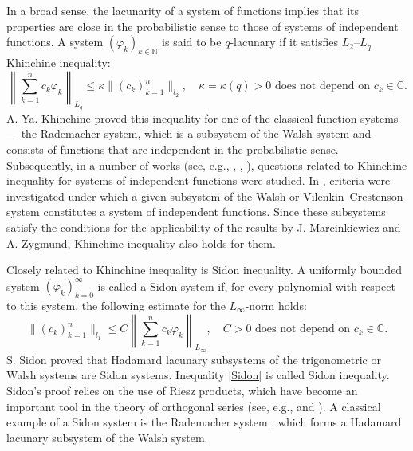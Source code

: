 \documentclass[12pt]{article}
\begin{document}
	In a broad sense, the lacunarity of a system of functions implies that its properties are close in the probabilistic sense to those of systems of independent functions. A system $(\varphi_k)_{k \in \mathbb{N}}$ is said to be $q$-lacunary if it satisfies $L_2$–$L_q$ Khinchine inequality:
	\begin{equation} \label{28042039}
		\left\|  
		\sum\limits_{k=1}^n c_k \varphi_k  
		\right\|_{L_q}
		\le 
		\kappa  
		\big\|  
		( c_k )_{k=1}^n  
		\big\|_{l_2}, 
		\quad 
		\text{$\kappa = \kappa(q) > 0$ does not depend on $c_k \in \mathbb{C}$}.
	\end{equation} 
	A. Ya. Khinchine \cite{Xinch} proved this inequality for one of the classical function systems --- the Rademacher system, which is a subsystem of the Walsh system and consists of functions that are independent in the probabilistic sense. Subsequently, in a number of works (see, e.g., \cite{Kolm-Xinch}, \cite{Marcinkiewicz-Zygmund}, \cite{Karlin}), questions related to Khinchine inequality for systems of independent functions were studied. In \cite{Kazakova-2}, criteria were investigated under which a given subsystem of the Walsh or Vilenkin--Crestenson system constitutes a system of independent functions. Since these subsystems satisfy the conditions for the applicability of the results by J. Marcinkiewicz and A. Zygmund, Khinchine inequality also holds for them.
	
	Closely related to Khinchine inequality is Sidon inequality. A uniformly bounded system \((\varphi_k)_{k=0}^{\infty}\) is called a Sidon system if, for every polynomial with respect to this system, the following estimate for the $L_\infty$-norm holds:
	\begin{equation} \label{Sidon}
		\big\|  
		( c_k )_{k=1}^n  
		\big\|_{l_1} \le  C \left\|  
		\sum\limits_{k=1}^n c_k \varphi_k  
		\right\|_{L_\infty}, \quad 
		\text{$C > 0$ does not depend on $c_k \in \mathbb{C}$}.
	\end{equation}
	S. Sidon \cite{SidonTrig, Sidon} proved that Hadamard lacunary subsystems of the trigonometric or Walsh systems are Sidon systems. Inequality \eqref{Sidon} is called Sidon inequality. Sidon's proof relies on the use of Riesz products, which have become an important tool in the theory of orthogonal series (see, e.g., \cite[Ch. 9, \S 4]{Kashin-Saakyan-1999} and \cite[Ch. VII]{Blei}). A classical example of a Sidon system is the Rademacher system \cite{Astashkin-2017}, which forms a Hadamard lacunary subsystem of the Walsh system.
	
\end{document}
